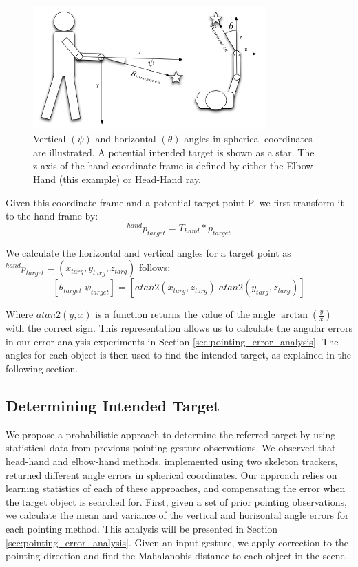 \begin{figure}[ht!]
\centering
\includegraphics[width=0.8\textwidth]{pics/person_angles_combined_2.png}
\caption{Vertical $(\psi)$ and horizontal $(\theta)$ angles in spherical coordinates are illustrated. A potential intended target is shown as a star. The z-axis of the hand coordinate frame is defined by either the Elbow-Hand (this example) or Head-Hand ray.}
\label{fig:pointing_angle_errors}
\end{figure}

Given this coordinate frame and a potential target point P, we first transform it to the hand frame by:
$$^{hand}p_{target} = T_{hand} * p_{target}$$

We calculate the horizontal and vertical angles for a target point as $^{hand}p_{target} = (x_{targ}, y_{targ}, z_{targ})$ follows:
$$[\theta_{target}\;\psi_{target}]=[atan2(x_{targ}, z_{targ})\;atan2(y_{targ}, z_{targ})]$$

Where $atan2(y,x)$ is a function returns the value of the angle $\arctan(\frac{y}{x})$ with the correct sign. This representation allows us to calculate the angular errors in our error analysis experiments in Section \ref{sec:pointing_error_analysis}. The angles for each object is then used to find the intended target, as explained in the following section.


\subsection{Determining Intended Target}
\label{sec:pointing_determining_intended_target}

We propose a probabilistic approach to determine the referred target by using statistical data from previous pointing gesture observations. We observed that head-hand and elbow-hand methods, implemented using two skeleton trackers, returned different angle errors in spherical coordinates. Our approach relies on learning statistics of each of these approaches, and compensating the error when the target object is searched for. First, given a set of prior pointing observations, we calculate the mean and variance of the vertical and horizontal angle errors for each pointing method. This analysis will be presented in Section \ref{sec:pointing_error_analysis}. Given an input gesture, we apply correction to the pointing direction and find the Mahalanobis distance to each object in the scene.

